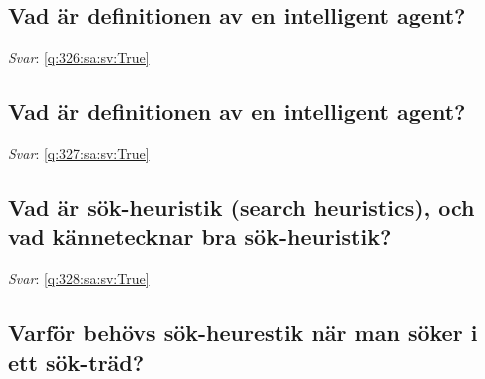 \documentclass[a4paper,11pt,oneside]{article}
\begin{document}
\begin{sloppypar}
\subsection{Vad \"ar definitionen av en intelligent agent?}

\label{q:326:sa:sv:False}

\vspace{2cm}

\noindent\makebox[\textwidth]{\hrulefill}

\vspace{1cm}

\textit{Svar}: \autoref{q:326:sa:sv:True}



\subsection{Vad \"ar definitionen av en intelligent agent?}

\label{q:327:sa:sv:False}

\vspace{2cm}

\noindent\makebox[\textwidth]{\hrulefill}

\vspace{1cm}

\textit{Svar}: \autoref{q:327:sa:sv:True}



\subsection{Vad \"ar s\"ok-heuristik (search heuristics), och vad k\"annetecknar bra s\"ok-heuristik?}

\label{q:328:sa:sv:False}

\vspace{2cm}

\noindent\makebox[\textwidth]{\hrulefill}

\vspace{1cm}

\textit{Svar}: \autoref{q:328:sa:sv:True}



\subsection{Varf\"or beh\"ovs s\"ok-heurestik n\"ar man s\"oker i ett s\"ok-tr\"ad?}

\label{q:329:sa:sv:False}

\vspace{2cm}


\end{sloppypar}
\end{document}

